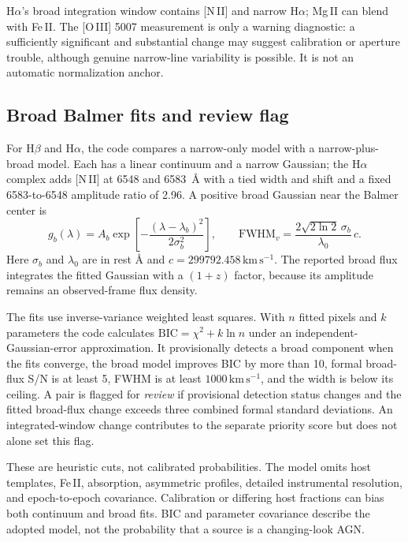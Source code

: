 \documentclass[11pt,a4paper]{article}
\begin{document}
H$\alpha$'s broad integration window contains [N\,II] and narrow H$\alpha$; Mg\,II can blend with Fe\,II. The [O\,III] 5007 measurement is only a warning diagnostic: a sufficiently significant and substantial change may suggest calibration or aperture trouble, although genuine narrow-line variability is possible. It is not an automatic normalization anchor.

\subsection{Broad Balmer fits and review flag}
For H$\beta$ and H$\alpha$, the code compares a narrow-only model with a narrow-plus-broad model. Each has a linear continuum and a narrow Gaussian; the H$\alpha$ complex adds [N\,II] at 6548 and 6583~\AA{} with a tied width and shift and a fixed 6583-to-6548 amplitude ratio of 2.96. A positive broad Gaussian near the Balmer center is
\begin{equation}
g_b(\lambda)=A_b\exp\!\left[-\frac{(\lambda-\lambda_b)^2}{2\sigma_b^2}\right],
\qquad
\mathrm{FWHM}_v=\frac{2\sqrt{2\ln2}\,\sigma_b}{\lambda_0}\,c .
\label{eq:broad}
\end{equation}
Here $\sigma_b$ and $\lambda_0$ are in rest \AA{} and $c=299792.458\,\mathrm{km\,s^{-1}}$. The reported broad flux integrates the fitted Gaussian with a $(1+z)$ factor, because its amplitude remains an observed-frame flux density.

The fits use inverse-variance weighted least squares. With $n$ fitted pixels and $k$ parameters the code calculates $\mathrm{BIC}=\chi^2+k\ln n$ under an independent-Gaussian-error approximation. It provisionally detects a broad component when the fits converge, the broad model improves BIC by more than 10, formal broad-flux S/N is at least 5, FWHM is at least $1000\,\mathrm{km\,s^{-1}}$, and the width is below its ceiling. A pair is flagged for \emph{review} if provisional detection status changes and the fitted broad-flux change exceeds three combined formal standard deviations. An integrated-window change contributes to the separate priority score but does not alone set this flag.

These are heuristic cuts, not calibrated probabilities. The model omits host templates, Fe\,II, absorption, asymmetric profiles, detailed instrumental resolution, and epoch-to-epoch covariance. Calibration or differing host fractions can bias both continuum and broad fits. BIC and parameter covariance describe the adopted model, not the probability that a source is a changing-look AGN.
\end{document}
